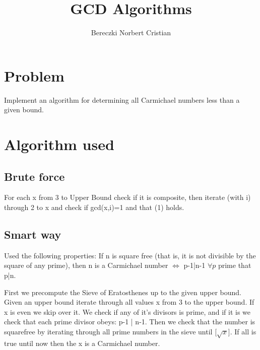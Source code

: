 \documentclass{article}
\begin{document}


\title{GCD Algorithms}
\author{Bereczki Norbert Cristian}
\maketitle


\section{Problem}
Implement an algorithm for determining all Carmichael numbers less than a given bound.

\section{Algorithm used}

\subsection{Brute force}

For each x from 3 to Upper Bound check if it is composite, then iterate (with i) through 2 to x and check if gcd(x,i)=1 and that (1) holds.

\subsection{Smart way}

Used the following properties:
If n is square free (that is, it is not divisible by the square of
any prime), then n is a Carmichael number $\iff$ p-1|n-1 $\forall p$ prime that p|n. 

First we precompute the Sieve of Eratosthenes up to the given upper bound. 
Given an upper bound iterate through all values x from 3 to the upper bound. If x is even we skip over it. We check if any of it's divisors is prime, and if it is we check that each prime divisor obeys: p-1 | n-1. Then we check that the number is squarefree by iterating through all prime numbers in the sieve until [$\sqrt{x}$]. If all is true until now then the x is a Carmichael number.
\end{document}
